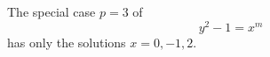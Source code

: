\begin{proposition}\label{eq:172}
    The special case $p=3$ of
\[
    y^2-1=x^m
\]
    has only the solutions $x=0,-1,2$.
\end{proposition}
